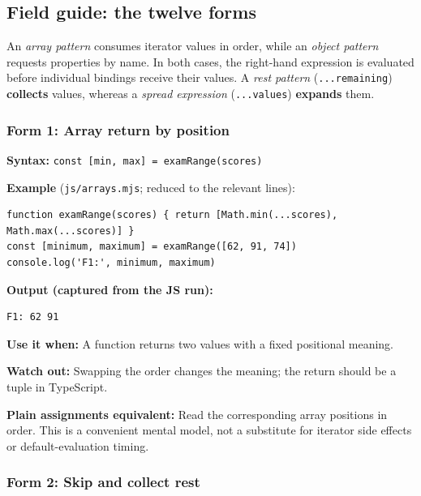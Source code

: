 \documentclass[
  10pt,
]{article}
\newcommand{\passthrough}[1]{#1}
\begin{document}
\subsection{Field guide: the twelve
forms}\label{field-guide-the-twelve-forms}

An \emph{array pattern} consumes iterator values in order, while an
\emph{object pattern} requests properties by name. In both cases, the
right-hand expression is evaluated before individual bindings receive
their values. A \emph{rest pattern}
(\passthrough{\lstinline!...remaining!}) \textbf{collects} values,
whereas a \emph{spread expression} (\passthrough{\lstinline!...values!})
\textbf{expands} them.

\subsubsection{Form 1: Array return by
position}\label{form-1-array-return-by-position}

\textbf{Syntax:}
\passthrough{\lstinline!const [min, max] = examRange(scores)!}

\textbf{Example} (\passthrough{\lstinline!js/arrays.mjs!}; reduced to
the relevant lines):

\begin{lstlisting}
function examRange(scores) { return [Math.min(...scores), Math.max(...scores)] }
const [minimum, maximum] = examRange([62, 91, 74])
console.log('F1:', minimum, maximum)
\end{lstlisting}

\textbf{Output (captured from the JS run):}

\begin{lstlisting}
F1: 62 91
\end{lstlisting}

\textbf{Use it when:} A function returns two values with a fixed
positional meaning.

\textbf{Watch out:} Swapping the order changes the meaning; the return
should be a tuple in TypeScript.

\textbf{Plain assignments equivalent:} Read the corresponding array
positions in order. This is a convenient mental model, not a substitute
for iterator side effects or default-evaluation timing.

\subsubsection{Form 2: Skip and collect
rest}\label{form-2-skip-and-collect-rest}
\end{document}
